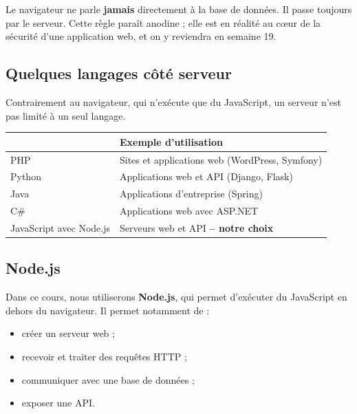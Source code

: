 \documentclass[a4paper,11pt]{article}
\newcommand{\hdr}[1]{\multicolumn{1}{l}{\color{white}\bfseries #1}}
\renewcommand{\arraystretch}{1.3}
\begin{document}
\begin{tcolorbox}[attention, title={À noter dès maintenant}]
Le navigateur ne parle \textbf{jamais} directement à la base de données. Il passe toujours par le serveur. Cette règle paraît anodine ; elle est en réalité au cœur de la sécurité d'une application web, et on y reviendra en semaine 19.
\end{tcolorbox}

\subsection{Quelques langages côté serveur}

Contrairement au navigateur, qui n'exécute que du JavaScript, un serveur n'est pas limité à un seul langage.

\begin{center}
\renewcommand{\arraystretch}{1.0}
\begin{tabularx}{\linewidth}{p{4.6cm}X}
\toprule
\rowcolor{uniNavy}
  \hdr{Langage} &  \hdr{Exemple d'utilisation} \\
\midrule
\rowcolor{uniPaper}
PHP & Sites et applications web (WordPress, Symfony)\\
Python & Applications web et API (Django, Flask)\\
\rowcolor{uniPaper}
Java & Applications d'entreprise (Spring)\\
C\# & Applications web avec ASP.NET\\
\rowcolor{uniPaper}
JavaScript avec Node.js & Serveurs web et API \quad\textbf{-- notre choix}\\
\bottomrule
\end{tabularx}
\end{center}

\subsection{Node.js}

Dans ce cours, nous utiliserons \textbf{Node.js}, qui permet d'exécuter du JavaScript en dehors du navigateur. Il permet notamment de :

\begin{itemize}
  \item créer un serveur web ;
  \item recevoir et traiter des requêtes HTTP ;
  \item communiquer avec une base de données ;
  \item exposer une API.
\end{itemize}
\end{document}
